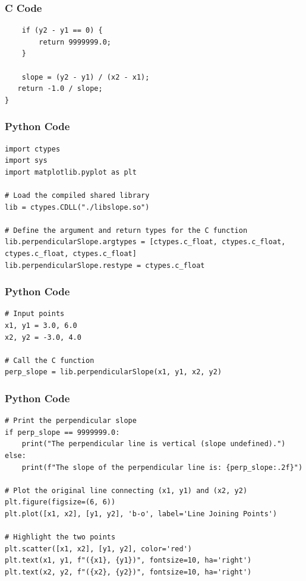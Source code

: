 \documentclass{beamer}
\begin{document}
\begin{frame}[fragile]
    \frametitle{C Code}
    \begin{lstlisting}
    if (y2 - y1 == 0) {
        return 9999999.0;
    }
    
    slope = (y2 - y1) / (x2 - x1);
   return -1.0 / slope;
}
\end{lstlisting}
\end{frame}


 \begin{frame}[fragile]
 \frametitle{Python Code}
 \begin{lstlisting}
import ctypes
import sys
import matplotlib.pyplot as plt

# Load the compiled shared library
lib = ctypes.CDLL("./libslope.so")

# Define the argument and return types for the C function
lib.perpendicularSlope.argtypes = [ctypes.c_float, ctypes.c_float, ctypes.c_float, ctypes.c_float]
lib.perpendicularSlope.restype = ctypes.c_float
\end{lstlisting}
\end{frame}

 \begin{frame}[fragile]
 \frametitle{Python Code}
 \begin{lstlisting}
# Input points
x1, y1 = 3.0, 6.0
x2, y2 = -3.0, 4.0

# Call the C function
perp_slope = lib.perpendicularSlope(x1, y1, x2, y2)

\end{lstlisting}
\end{frame}

 \begin{frame}[fragile]
 \frametitle{Python Code}
 \begin{lstlisting}
# Print the perpendicular slope
if perp_slope == 9999999.0:
    print("The perpendicular line is vertical (slope undefined).")
else:
    print(f"The slope of the perpendicular line is: {perp_slope:.2f}")

# Plot the original line connecting (x1, y1) and (x2, y2)
plt.figure(figsize=(6, 6))
plt.plot([x1, x2], [y1, y2], 'b-o', label='Line Joining Points')

# Highlight the two points
plt.scatter([x1, x2], [y1, y2], color='red')
plt.text(x1, y1, f"({x1}, {y1})", fontsize=10, ha='right')
plt.text(x2, y2, f"({x2}, {y2})", fontsize=10, ha='right')
\end{lstlisting}
\end{frame}
\end{document}
